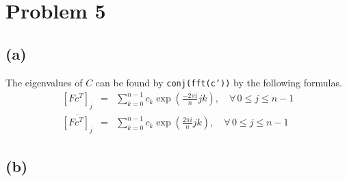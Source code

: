 \documentclass[11pt]{article}
\theoremstyle{definition}
\theoremstyle{remark}
\newcommand{\newquestion}{\hrulefill\vspace{-0.8\baselineskip}\\\null\hrulefill\vspace{-1.0\baselineskip}}
\newcommand{\newpart}{\vspace{-0.5\baselineskip}\hrulefill\vspace{-1.3\baselineskip}}
\theoremstyle{plain}
\begin{document}
\newquestion
%
%
\section*{Problem 5}

\newpart
\subsection*{(a)}
The eigenvalues of $C$ can be found by \texttt{conj(fft(c'))} by the following formulas.
\begin{eqnarray*}
  \left[Fc^T\right]_j&=&\sum_{k=0}^{n-1}c_k\exp\left(\frac{-2\pi i}{n}jk\right),\quad\forall\,0\leq j\leq n-1\\
  \overline{\left[Fc^T\right]_j}&=&\sum_{k=0}^{n-1}c_k\exp\left(\frac{2\pi i}{n}jk\right),\quad\forall\,0\leq j\leq n-1
\end{eqnarray*}

\newpart
\subsection*{(b)}
\end{document}

